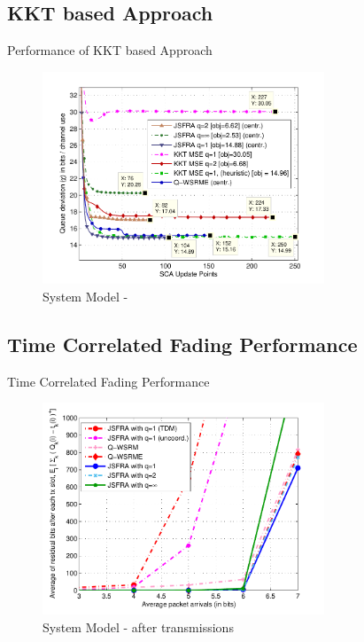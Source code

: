 \documentclass[9pt]{beamer}
\begin{document}
\subsection{KKT based Approach}

\begin{frame}{Performance of KKT based Approach}
	\begin{figure}
		\centering
		\includegraphics[width=0.75\textwidth]{fig-9-3}
		\caption{System Model - }
	\end{figure}
\end{frame}

\subsection{Time Correlated Fading Performance}

\begin{frame}{Time Correlated Fading Performance}
	\begin{figure}
		\centering
		\includegraphics[width=0.75\textwidth]{average_queue_over_time-3}
		\caption{System Model -  after  transmissions}
	\end{figure}
\end{frame}
\end{document}
